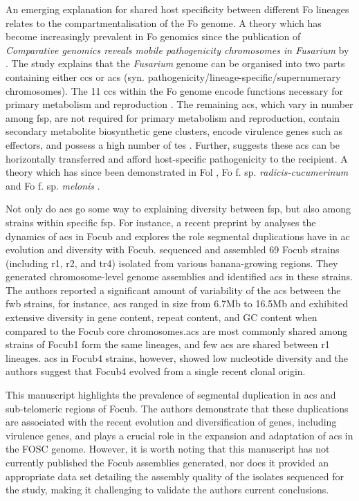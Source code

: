 An emerging explanation for shared host specificity between different \ac{Fo} lineages relates to the compartmentalisation of the \acl{Fo} genome. A theory which has become increasingly prevalent in \ac{Fo} genomics since the publication of \textit{Comparative genomics reveals mobile pathogenicity chromosomes in Fusarium} by \textcite{Ma2010}. The study explains that the \textit{Fusarium} genome can be organised into two parts containing either \acp{cc} or \acp{ac} (syn. pathogenicity/lineage-specific/supernumerary chromosomes). The 11 \acp{cc} within the \ac{Fo} genome encode functions necessary for primary metabolism and reproduction \parencite{Dam2017}. The remaining \acp{ac}, which vary in number among \ac{fsp}, are not required for primary metabolism and reproduction, contain secondary metabolite biosynthetic gene clusters, encode virulence genes such as effectors, and possess a high number of \acp{te} \parencite{Ma2010, Schmidt2013, Witte2021}. Further, \textcite{Ma2010} suggests these \acp{ac} can be horizontally transferred and afford host-specific pathogenicity to the recipient. A theory which has since been demonstrated in \ac{Fol} \parencite{Vlaardingerbroek2016, Li2020}, \ac{Fo} f. sp. \textit{radicis-cucumerinum} \parencite{Dam2017} and \ac{Fo} f. sp. \textit{melonis} \parencite{Li2020}. 
 
Not only do \acp{ac} go some way to explaining diversity between \ac{fsp}, but also among strains within specific \ac{fsp}. For instance, a recent preprint by \textcite{Westerhoven2023} analyses the dynamics of \acp{ac} in \ac{Focub} and explores the role segmental duplications have in \ac{ac} evolution and diversity with \ac{Focub}. \textcite{Westerhoven2023} sequenced and assembled 69 \ac{Focub} strains (including \ac{r1}, \ac{r2}, and \ac{tr4})  isolated from various banana-growing regions. They generated chromosome-level genome assemblies and identified \acp{ac} in these strains.  The authors reported a significant amount of variability of the \acp{ac} between the \ac{fwb} strains, for instance, \acp{ac} ranged in size from 6.7Mb to 16.5Mb and exhibited extensive diversity in gene content, repeat content, and GC content when compared to the \ac{Focub} core chromosomes.\Acp{ac} are most commonly shared among strains of \ac{Focub1} form the same lineages, and few \acp{ac} are shared between \ac{r1} lineages. \Acp{ac} in \ac{Focub4} strains, however, showed low nucleotide diversity and the authors suggest that \ac{Focub4} evolved from a single recent clonal origin. 

This manuscript highlights the prevalence of segmental duplication in \acp{ac} and sub-telomeric regions of \ac{Focub}. The authors demonstrate that these duplications are associated with the recent evolution and diversification of genes, including virulence genes, and plays a crucial role in the expansion and adaptation of \acp{ac} in the \ac{FOSC} genome. However, it is worth noting that this manuscript has not currently published the \ac{Focub} assemblies generated, nor does it provided an appropriate data set detailing the assembly quality of the isolates sequenced for the study, making it challenging to validate the authors current conclusions. 

